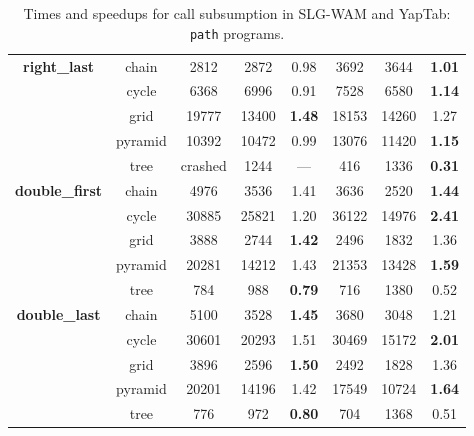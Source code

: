 \begin{table}[ht]
{\begin{tabular}{cc|ccc|ccc}
   \hline
   \multirow{5}{*}{\textbf{right\_last}} &  \scriptsize{chain}  &  2812 & 2872 &  0.98  & 3692 & 3644 &  \textbf{1.01} \\
   &  \scriptsize{cycle}  &  6368 & 6996 &  0.91  & 7528 & 6580 &  \textbf{1.14} \\
   &  \scriptsize{grid}  &  19777 & 13400 &  \textbf{1.48}  & 18153 & 14260 &  1.27 \\
   &  \scriptsize{pyramid}  &  10392 & 10472 &  0.99  & 13076 & 11420 &  \textbf{1.15} \\
   &  \scriptsize{tree}  &  \scriptsize{crashed} & 1244 &  ---  & 416 & 1336 &  \textbf{0.31} \\
   \hline
\multirow{5}{*}{\textbf{double\_first}} &  \scriptsize{chain}  &  4976 & 3536 &  1.41  & 3636 & 2520 &  \textbf{1.44} \\
&  \scriptsize{cycle}  &  30885 & 25821 &  1.20  & 36122 & 14976 &  \textbf{2.41} \\
&  \scriptsize{grid}  &  3888 & 2744 &  \textbf{1.42}  & 2496 & 1832 &  1.36 \\
&  \scriptsize{pyramid}  &  20281 & 14212 &  1.43  & 21353 & 13428 &  \textbf{1.59} \\
&  \scriptsize{tree}  &  784 & 988 &  \textbf{0.79}  & 716 & 1380 &  0.52 \\
\hline
\multirow{5}{*}{\textbf{double\_last}} &  \scriptsize{chain}  &  5100 & 3528 &  \textbf{1.45}  & 3680 & 3048 &  1.21 \\
&  \scriptsize{cycle}  &  30601 & 20293 &  1.51  & 30469 & 15172 &  \textbf{2.01} \\
&  \scriptsize{grid}  &  3896 & 2596 &  \textbf{1.50}  & 2492 & 1828 &  1.36 \\
&  \scriptsize{pyramid}  &  20201 & 14196 &  1.42  & 17549 & 10724 &  \textbf{1.64} \\
&  \scriptsize{tree}  &  776 & 972 &  \textbf{0.80}  & 704 & 1368 &  0.51 \\
\hline

\hline
\end{tabular}
}
\caption{Times and speedups for call subsumption in SLG-WAM and YapTab: \texttt{path} programs.}
\label{tbl:result_detail_path}
\end{table}
